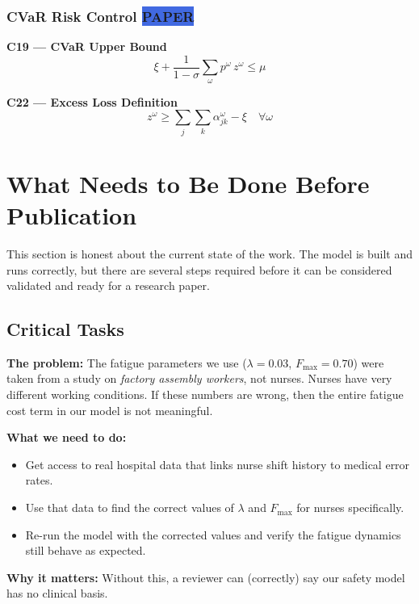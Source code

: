 \documentclass[12pt,a4paper]{article}
\newcommand{\frombadge}{\colorbox{royalblue}{\tiny\color{white}\textbf{PAPER}}\,}
\begin{document}
\subsubsection{CVaR Risk Control \frombadge}

\begin{eqbox}
\textbf{C19 — CVaR Upper Bound}
\begin{equation}
  \xi + \frac{1}{1-\sigma}\sum_{\omega} p^{\omega}\, z^{\omega} \leq \mu
\end{equation}

\textbf{C22 — Excess Loss Definition}
\begin{equation}
  z^{\omega} \geq \sum_j\sum_k \alpha_{jk}^{\omega} - \xi \quad \forall\omega
\end{equation}
\end{eqbox}

\newpage
\section{What Needs to Be Done Before Publication}

This section is honest about the current state of the work. The model is built and runs correctly, but there are several steps required before it can be considered validated and ready for a research paper.

\subsection{Critical Tasks}

\begin{warnbox}
\textbf{The problem:} The fatigue parameters we use ($\lambda=0.03$, $F_{\max}=0.70$) were taken from a study on \emph{factory assembly workers}, not nurses. Nurses have very different working conditions. If these numbers are wrong, then the entire fatigue cost term in our model is not meaningful.

\textbf{What we need to do:}
\begin{itemize}[itemsep=2pt]
  \item Get access to real hospital data that links nurse shift history to medical error rates.
  \item Use that data to find the correct values of $\lambda$ and $F_{\max}$ for nurses specifically.
  \item Re-run the model with the corrected values and verify the fatigue dynamics still behave as expected.
\end{itemize}

\textbf{Why it matters:} Without this, a reviewer can (correctly) say our safety model has no clinical basis.\\
\end{warnbox}
\end{document}
